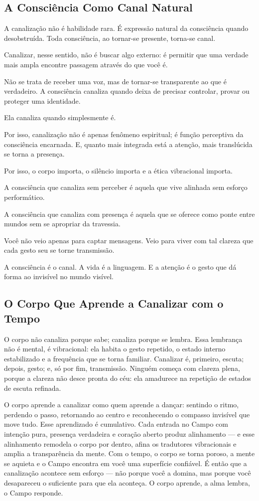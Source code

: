 \documentclass[12pt]{book}
\begin{document}
\subsection*{A Consciência Como Canal Natural}

A canalização não é habilidade rara. É expressão natural da consciência quando desobstruída. Toda consciência, ao tornar-se presente, torna-se canal.

Canalizar, nesse sentido, não é buscar algo externo: é permitir que uma verdade mais ampla encontre passagem através do que você é.

Não se trata de receber uma voz, mas de tornar-se transparente ao que é verdadeiro. A consciência canaliza quando deixa de precisar controlar, provar ou proteger uma identidade.

Ela canaliza quando simplesmente é.

Por isso, canalização não é apenas fenômeno espiritual; é função perceptiva da consciência encarnada. E, quanto mais integrada está a atenção, mais translúcida se torna a presença.

Por isso, o corpo importa, o silêncio importa e a ética vibracional importa.

A consciência que canaliza sem perceber é aquela que vive alinhada sem esforço performático.

A consciência que canaliza com presença é aquela que se oferece como ponte entre mundos sem se apropriar da travessia.

Você não veio apenas para captar mensagens. Veio para viver com tal clareza que cada gesto seu se torne transmissão.

A consciência é o canal. A vida é a linguagem. E a atenção é o gesto que dá forma ao invisível no mundo visível.

\subsection*{O Corpo Que Aprende a Canalizar com o Tempo}

O corpo não canaliza porque sabe; canaliza porque se lembra. Essa lembrança não é mental, é vibracional: ela habita o gesto repetido, o estado interno estabilizado e a frequência que se torna familiar. Canalizar é, primeiro, escuta; depois, gesto; e, só por fim, transmissão. Ninguém começa com clareza plena, porque a clareza não desce pronta do céu: ela amadurece na repetição de estados de escuta refinada.

O corpo aprende a canalizar como quem aprende a dançar: sentindo o ritmo, perdendo o passo, retornando ao centro e reconhecendo o compasso invisível que move tudo. Esse aprendizado é cumulativo. Cada entrada no Campo com intenção pura, presença verdadeira e coração aberto produz alinhamento — e esse alinhamento remodela o corpo por dentro, afina os tradutores vibracionais e amplia a transparência da mente. Com o tempo, o corpo se torna poroso, a mente se aquieta e o Campo encontra em você uma superfície confiável. É então que a canalização acontece sem esforço — não porque você a domina, mas porque você desapareceu o suficiente para que ela aconteça. O corpo aprende, a alma lembra, o Campo responde.
\end{document}
